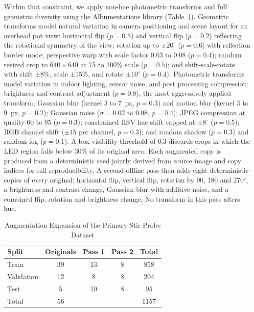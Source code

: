 ﻿\documentclass[journal]{IEEEtran}
\begin{document}
Within that constraint, we apply non-hue photometric transforms and full geometric diversity using the Albumentations library (Table~\ref{tab:aug}). Geometric transforms model natural variation in camera positioning and scene layout for an overhead pot view: horizontal flip ($p=0.5$) and vertical flip ($p=0.2$) reflecting the rotational symmetry of the view; rotation up to $\pm 20^{\circ}$ ($p=0.6$) with reflection border mode; perspective warp with scale factor 0.03 to 0.08 ($p=0.4$); random resized crop to $640 \times 640$ at 75 to 100\% scale ($p=0.5$); and shift-scale-rotate with shift $\pm 8\%$, scale $\pm 15\%$, and rotate $\pm 10^{\circ}$ ($p=0.4$). Photometric transforms model variation in indoor lighting, sensor noise, and post processing compression: brightness and contrast adjustment ($p=0.8$), the most aggressively applied transform; Gaussian blur (kernel 3 to 7~px, $p=0.3$) and motion blur (kernel 3 to 9~px, $p=0.2$); Gaussian noise ($\sigma = 0.02$ to $0.08$, $p=0.4$); JPEG compression at quality 60 to 95 ($p=0.3$); constrained HSV hue shift capped at $\pm 8^{\circ}$ ($p=0.5$); RGB channel shift ($\pm 15$ per channel, $p=0.3$); and random shadow ($p=0.3$) and random fog ($p=0.1$). A box-visibility threshold of 0.3 discards crops in which the LED region falls below 30\% of its original area. Each augmented copy is produced from a deterministic seed jointly derived from source image and copy indices for full reproducibility. A second offline pass then adds eight deterministic copies of every original: horizontal flip, vertical flip, rotation by 90, 180 and 270$^{\circ}$, a brightness and contrast change, Gaussian blur with additive noise, and a combined flip, rotation and brightness change. No transform in this pass alters hue.

\begin{table}[!t]
\renewcommand{\arraystretch}{1.3}
\caption{Augmentation Expansion of the Primary Stir Probe Dataset}
\label{tab:aug}
\centering
\begin{tabular}{l c c c c}
\toprule
\textbf{Split} & \textbf{Originals} & \textbf{Pass 1} & \textbf{Pass 2} & \textbf{Total} \\
\midrule
Train      & 39 & 13 & 8 & 858 \\
Validation & 12 & 8  & 8 & 204 \\
Test       & 5  & 10 & 8 & 95 \\
\midrule
Total      & 56 &    &   & 1157 \\
\bottomrule
\end{tabular}
\end{table}
\end{document}
